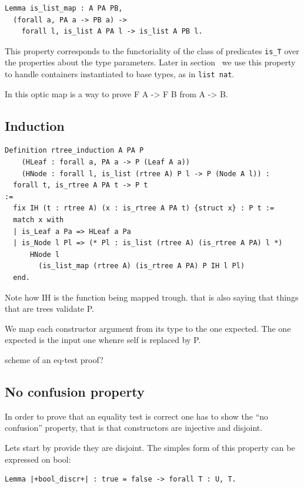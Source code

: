 \documentclass[sigplan,10pt,review]{acmart}\settopmatter{printfolios=true,printccs=false,printacmref=false}
\begin{document}
\begin{lstlisting}
Lemma is_list_map : A PA PB,
  (forall a, PA a -> PB a) ->
    forall l, is_list A PA l -> is_list A PB l.
\end{lstlisting}

\noindent
This property corresponds to the functoriality of the class of
predicates \lstinline+is_T+ over the properties about the type
parameters.  Later in section~\label{sec:derive:eqOK} we use this
property to handle containers instantiated to base types, as in
\lstinline+list nat+.

In this optic map is a way to prove F A -> F B from A -> B.

\subsection{Induction} %

\begin{lstlisting}
Definition rtree_induction A PA P  
    (HLeaf : forall a, PA a -> P (Leaf A a))
    (HNode : forall l, is_list (rtree A) P l -> P (Node A l)) :
  forall t, is_rtree A PA t -> P t
:=
  fix IH (t : rtree A) (x : is_rtree A PA t) {struct x} : P t :=
  match x with
  | is_Leaf a Pa => HLeaf a Pa
  | is_Node l Pl => (* Pl : is_list (rtree A) (is_rtree A PA) l *)
      HNode l
        (is_list_map (rtree A) (is_rtree A PA) P IH l Pl)
  end.
\end{lstlisting}

Note how IH is the function being mapped trough. that
is also saying that things that are trees validate P.

We map each constructor argument from its type to the one
expected. The one expected is the input one whenre self
is replaced by P.

scheme of an eq-test proof?

\subsection{No confusion property} %

In order to prove that an equality test is correct
one has to show the ``no confusion'' property, that is that
constructors are injective and disjoint.

Lets start by provide they are disjoint.
The simples form of this property can be expressed on bool:

\begin{lstlisting}
Lemma |+bool_discr+| : true = false -> forall T : U, T.
\end{lstlisting}
\end{document}
